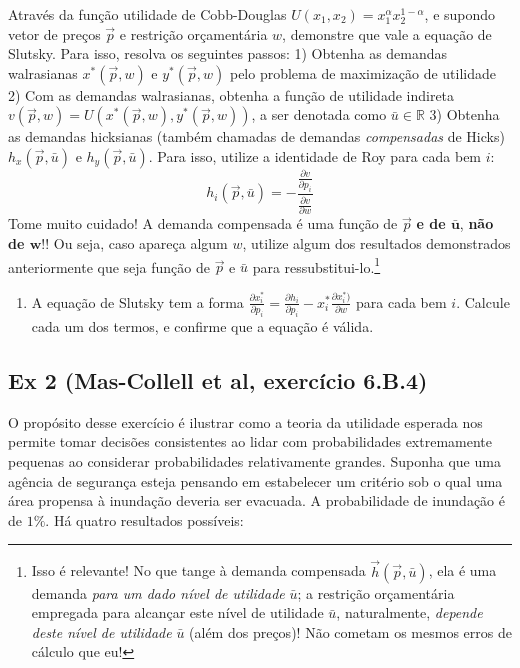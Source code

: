 \documentclass[12pt]{article}
\numberwithin{equation}{section}
\theoremstyle{plain}
\theoremstyle{definition}
\theoremstyle{remark}
\begin{document}
Através da função utilidade de Cobb-Douglas \(U(x_{1},x_{2}) = x_{1}^{\alpha}x_{2}^{1-\alpha}\), e supondo vetor de preços \(\vec{p}\) e restrição orçamentária \(w\), demonstre que vale a equação de Slutsky. Para isso, resolva os seguintes passos: 1) Obtenha as demandas walrasianas \(x^*(\vec{p}, w)\) e \(y^*(\vec{p},w)\) pelo problema de maximização de utilidade 2) Com as demandas walrasianas, obtenha a função de utilidade indireta \(v(\vec{p}, w) = U(x^*(\vec{p},w), y^*(\vec{p},w))\), a ser denotada como \(\bar{u} \in \mathbb{R}\) 3) Obtenha as demandas hicksianas (também chamadas de demandas \textit{compensadas} de Hicks) \(h_{x}(\vec{p}, \bar{u})\) e \(h_{y}(\vec{p}, \bar{u})\). Para isso, utilize a identidade de Roy para cada bem \(i\):
\[
h_{i}(\vec{p}, \bar{u}) = -\frac{\frac{ \partial v }{ \partial p_{i} }}{\frac{ \partial v }{ \partial w } }
\]
Tome muito cuidado! A demanda compensada é uma função de \(\vec{p}\) \textbf{e de \(\mathbf{\bar{u}}\)}, \textbf{não de \(\mathbf{w}\)}!! Ou seja, caso apareça algum \(w\), utilize algum dos resultados demonstrados anteriormente que seja função de \(\vec{p}\) e \(\bar{u}\) para ressubstitui-lo.\footnote{Isso é relevante! No que tange à demanda compensada \(\vec{h}(\vec{p}, \bar{u})\), ela é uma demanda \textit{para um dado nível de utilidade} \(\bar{u}\); a restrição orçamentária empregada para alcançar este nível de utilidade \(\bar{u}\), naturalmente, \textit{depende deste nível de utilidade} \(\bar{u}\) (além dos preços)! Não cometam os mesmos erros de cálculo que eu!}

\begin{enumerate}
\def\labelenumi{\arabic{enumi})}
\setcounter{enumi}{3}
\tightlist
\item
  A equação de Slutsky tem a forma \(\frac{ \partial x^*_{i} }{ \partial p_{i} } = \frac{ \partial h_{i} }{ \partial p_{i} } - x^*_{i} \frac{ \partial x_{i}^*) }{ \partial w }\) para cada bem \(i\). Calcule cada um dos termos, e confirme que a equação é válida.
\end{enumerate}

\hypertarget{ex-2-mas-collell-et-al-exercuxedcio-6.b.4}{%
\subsection{Ex 2 (Mas-Collell et al, exercício 6.B.4)}\label{ex-2-mas-collell-et-al-exercuxedcio-6.b.4}}

O propósito desse exercício é ilustrar como a teoria da utilidade esperada nos permite tomar decisões consistentes ao lidar com probabilidades extremamente pequenas ao considerar probabilidades relativamente grandes. Suponha que uma agência de segurança esteja pensando em estabelecer um critério sob o qual uma área propensa à inundação deveria ser evacuada. A probabilidade de inundação é de \(1\%\). Há quatro resultados possíveis:
\end{document}
